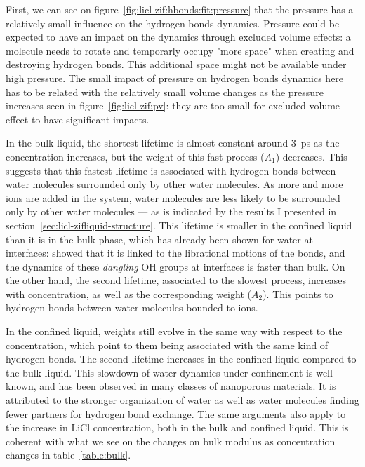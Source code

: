 \documentclass[thesis]{subfiles}
\begin{document}
%     

First, we can see on figure~\ref{fig:licl-zif:hbonds:fit:pressure} that the
pressure has a relatively small influence on the hydrogen bonds dynamics.
Pressure could be expected to have an impact on the dynamics through excluded
volume effects\cite{Fogarty2014}: a molecule needs to rotate and temporarly
occupy "more space"  when creating and destroying hydrogen bonds. This
additional space might not be available under high pressure. The small impact of
pressure on hydrogen bonds dynamics here has to be related with the relatively
small volume changes as the pressure increases seen in
figure~\ref{fig:licl-zif:pv}: they are too small for excluded volume effect to
have significant impacts.

In the bulk liquid, the shortest lifetime is almost constant around \SI{3}{ps}
as the concentration increases, but the weight of this fast process ($A_1$)
decreases. This suggests that this fastest lifetime is associated with hydrogen
bonds between water molecules surrounded only by other water molecules. As more
and more ions are added in the system, water molecules are less likely to be
surrounded only by other water molecules --- as is indicated by the results I
presented in section~\ref{sec:licl-zifliquid-structure}. This lifetime is
smaller in the confined liquid than it is in the bulk phase, which has already
been shown for water at interfaces: \citeauthor{Fogarty2014}\cite{Fogarty2014}
showed that it is linked to the librational motions of the  bonds, and
the dynamics of these \emph{dangling} OH groups at interfaces is faster than
bulk\cite{Scatena2001}. On the other hand, the second lifetime, associated to
the slowest process, increases with concentration, as well as the corresponding
weight ($A_2$). This points to hydrogen bonds between water molecules bounded to
ions.

In the confined liquid, weights still evolve in the same way with respect to the
concentration, which point to them being associated with the same kind of
hydrogen bonds. The second lifetime increases in the confined liquid compared to
the bulk liquid. This slowdown of water dynamics under confinement is
well-known\cite{Fogarty2014}, and has been observed in many classes of
nanoporous materials\cite{Jeffery2004, RomeroVargasCastrillon2009, Haigis2013,
Scalfi2018}. It is attributed to the stronger organization of water as well as
water molecules finding fewer partners for hydrogen bond exchange. The same
arguments also apply to the increase in LiCl concentration, both in the bulk and
confined liquid. This is coherent with what we see on the changes on bulk
modulus as concentration changes in table~\ref{table:bulk}.
\end{document}
